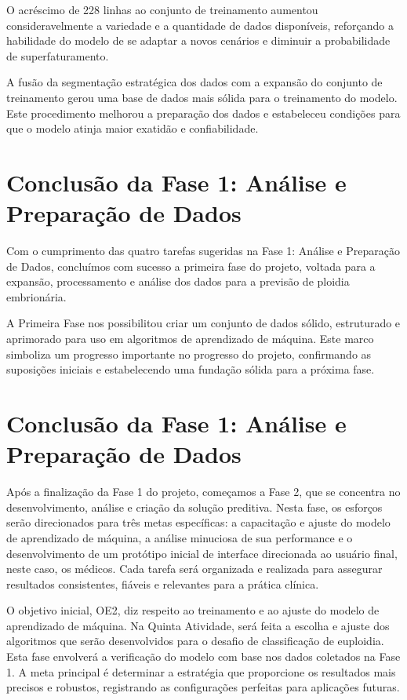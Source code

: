 O acréscimo de 228 linhas ao conjunto de treinamento aumentou consideravelmente a variedade e a quantidade de dados disponíveis, reforçando a habilidade do modelo de se adaptar a novos cenários e diminuir a probabilidade de superfaturamento.

A fusão da segmentação estratégica dos dados com a expansão do conjunto de treinamento gerou uma base de dados mais sólida para o treinamento do modelo. Este procedimento melhorou a preparação dos dados e estabeleceu condições para que o modelo atinja maior exatidão e confiabilidade.

\section{Conclusão da Fase 1: Análise e Preparação de Dados}

Com o cumprimento das quatro tarefas sugeridas na Fase 1: Análise e Preparação de Dados, concluímos com sucesso a primeira fase do projeto, voltada para a expansão, processamento e análise dos dados para a previsão de ploidia embrionária.

A Primeira Fase nos possibilitou criar um conjunto de dados sólido, estruturado e aprimorado para uso em algoritmos de aprendizado de máquina. Este marco simboliza um progresso importante no progresso do projeto, confirmando as suposições iniciais e estabelecendo uma fundação sólida para a próxima fase.

\section{Conclusão da Fase 1: Análise e Preparação de Dados}

Após a finalização da Fase 1 do projeto, começamos a Fase 2, que se concentra no desenvolvimento, análise e criação da solução preditiva. Nesta fase, os esforços serão direcionados para três metas específicas: a capacitação e ajuste do modelo de aprendizado de máquina, a análise minuciosa de sua performance e o desenvolvimento de um protótipo inicial de interface direcionada ao usuário final, neste caso, os médicos. Cada tarefa será organizada e realizada para assegurar resultados consistentes, fiáveis e relevantes para a prática clínica.

O objetivo inicial, OE2, diz respeito ao treinamento e ao ajuste do modelo de aprendizado de máquina. Na Quinta Atividade, será feita a escolha e ajuste dos algoritmos que serão desenvolvidos para o desafio de classificação de euploidia. Esta fase envolverá a verificação do modelo com base nos dados coletados na Fase 1. A meta principal é determinar a estratégia que proporcione os resultados mais precisos e robustos, registrando as configurações perfeitas para aplicações futuras.

